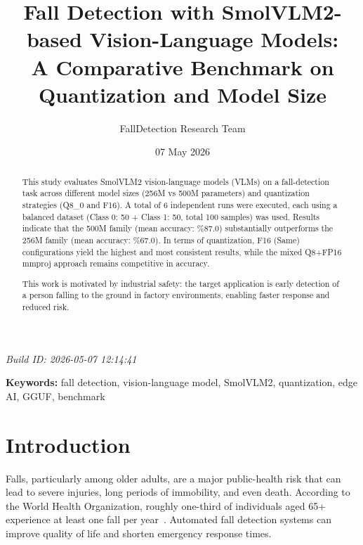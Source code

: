 \documentclass[12pt, a4paper]{article}
\title{%
    \textbf{Fall Detection with SmolVLM2-based Vision-Language Models:\\
    A Comparative Benchmark on Quantization and Model Size}
}
\author{FallDetection Research Team}
\date{07 May 2026}
\begin{document}
\shorthandoff{=} %

\maketitle

\begin{center}
\small \textit{Build ID: 2026-05-07 12:14:41}
\end{center}

\begin{abstract}
This study evaluates SmolVLM2 vision-language models (VLMs) on a fall-detection
task across different model sizes (256M vs 500M parameters) and quantization
strategies (Q8\_0 and F16). A total of 6 independent runs were
executed, each using a balanced dataset (Class 0: 50 + Class 1: 50, total 100 samples) was used. Results indicate that the
500M family (mean accuracy: \%87.0) substantially outperforms the 256M
family (mean accuracy: \%67.0). In terms of quantization, F16 (Same)
configurations yield the highest and most consistent results, while the mixed
Q8+FP16 mmproj approach remains competitive in accuracy.

This work is motivated by industrial safety: the target application is early
detection of a person falling to the ground in factory environments, enabling
faster response and reduced risk.
\end{abstract}

\textbf{Keywords:} fall detection, vision-language model, SmolVLM2, quantization,
edge AI, GGUF, benchmark

\newpage
\setcounter{tocdepth}{2}
\tableofcontents
\newpage

\section{Introduction}

Falls, particularly among older adults, are a major public-health risk that can
lead to severe injuries, long periods of immobility, and even death. According
to the World Health Organization, roughly one-third of individuals aged 65+
experience at least one fall per year~\cite{who2021falls}. Automated fall
detection systems can improve quality of life and shorten emergency response
times.
\end{document}

